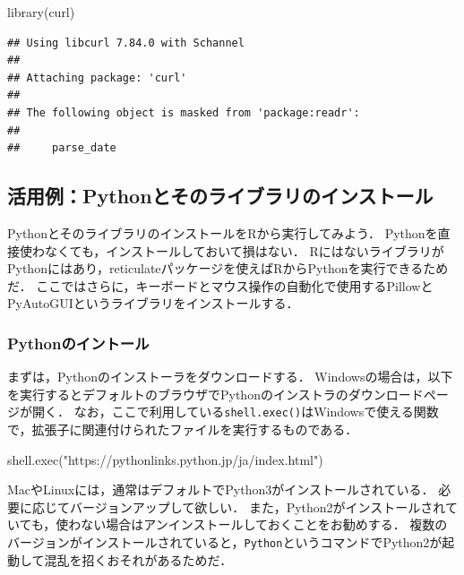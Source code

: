 \documentclass[
]{article}
\newenvironment{Shaded}{\begin{snugshade}}{\end{snugshade}}
\newcommand{\FunctionTok}[1]{\textcolor[rgb]{0.00,0.00,0.00}{#1}}
\newcommand{\NormalTok}[1]{#1}
\newcommand{\StringTok}[1]{\textcolor[rgb]{0.31,0.60,0.02}{#1}}
\begin{document}
\begin{Shaded}
\begin{Highlighting}[]
\FunctionTok{library}\NormalTok{(curl)}
\end{Highlighting}
\end{Shaded}

\begin{verbatim}
## Using libcurl 7.84.0 with Schannel
## 
## Attaching package: 'curl'
## 
## The following object is masked from 'package:readr':
## 
##     parse_date
\end{verbatim}

\hypertarget{install_python}{%
\subsection{活用例：Pythonとそのライブラリのインストール}\label{install_python}}

PythonとそのライブラリのインストールをRから実行してみよう．
Pythonを直接使わなくても，インストールしておいて損はない．
RにはないライブラリがPythonにはあり，reticulateパッケージを使えばRからPythonを実行できるためだ．
ここではさらに，キーボードとマウス操作の自動化で使用するPillowとPyAutoGUIというライブラリをインストールする．

\hypertarget{pythonux306eux30a4ux30f3ux30c8ux30fcux30eb}{%
\subsubsection{Pythonのイントール}\label{pythonux306eux30a4ux30f3ux30c8ux30fcux30eb}}

まずは，Pythonのインストーラをダウンロードする．
Windowsの場合は，以下を実行するとデフォルトのブラウザでPythonのインストラのダウンロードページが開く．
なお，ここで利用している\texttt{shell.exec()}はWindowsで使える関数で，拡張子に関連付けられたファイルを実行するものである．

\begin{Shaded}
\begin{Highlighting}[]
\FunctionTok{shell.exec}\NormalTok{(}\StringTok{"https://pythonlinks.python.jp/ja/index.html"}\NormalTok{)}
\end{Highlighting}
\end{Shaded}

MacやLinuxには，通常はデフォルトでPython3がインストールされている．
必要に応じてバージョンアップして欲しい．
また，Python2がインストールされていても，使わない場合はアンインストールしておくことをお勧めする．
複数のバージョンがインストールされていると，\texttt{Python}というコマンドでPython2が起動して混乱を招くおそれがあるためだ．
\end{document}
